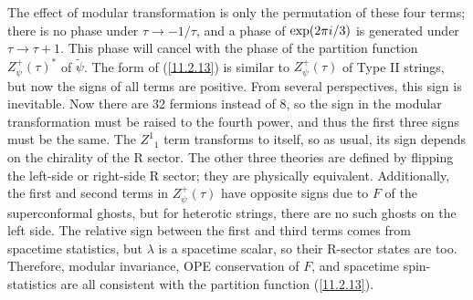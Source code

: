 The effect of modular transformation is only the permutation of these four terms; there is no phase under $\tau\to -1/\tau$, and a phase of $\exp(2\pi i/3)$ is generated under $\tau\to\tau+1$. This phase will cancel with the phase of the partition function $Z_{\psi}^{+}(\tau)^{\ast}$ of $\tilde{\psi}$. The form of (\ref{11.2.13}) is similar to $Z_{\psi}^{+}(\tau)$ of Type II strings, but now the signs of all terms are positive. From several perspectives, this sign is inevitable. Now there are 32 fermions instead of 8, so the sign in the modular transformation must be raised to the fourth power, and thus the first three signs must be the same. The $Z^{1}{}_{1}$ term transforms to itself, so as usual, its sign depends on the chirality of the R sector. The other three theories are defined by flipping the left-side or right-side R sector; they are physically equivalent. Additionally, the first and second terms in $Z_{\psi}^{+}(\tau)$ have opposite signs due to $F$ of the superconformal ghosts, but for heterotic strings, there are no such ghosts on the left side. The relative sign between the first and third terms comes from spacetime statistics, but $\lambda$ is a spacetime scalar, so their R-sector states are too. Therefore, modular invariance, OPE conservation of $F$, and spacetime spin-statistics are all consistent with the partition function (\ref{11.2.13}).

